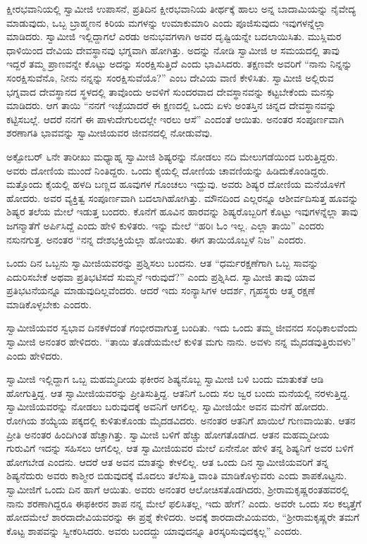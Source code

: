 \vskip 2pt

 ಕ್ಷೀರಭವಾನಿಯಲ್ಲಿ ಸ್ವಾಮೀಜಿ ಉಪಾಸನೆ, ಪ್ರತಿದಿನ ಕ್ಷೀರಭವಾನಿಯ ತೀರ್ಥಕ್ಕೆ ಹಾಲು ಅನ್ನ ಬಾದಾಮಿಯನ್ನು ನೈವೇದ್ಯ ಮಾಡುವುದು, ಒಬ್ಬ ಬ್ರಾಹ್ಮಣನ ಕಿರಿಯ ಮಗಳನ್ನು ಉಮಾಕುಮಾರಿ ಎಂದು ಪೂಜಿಸುವುದು ಇವುಗಳನ್ನೆಲ್ಲಾ ಮಾಡಿದರು. ಸ್ವಾಮೀಜಿ ಇಲ್ಲಿದ್ದಾಗಲೆ ಎರಡು ಅನುಭವಗಳಾಗಿ ಅವರ ದೃಷ್ಟಿಯನ್ನೇ ಬದಲಾಯಿಸಿತು. ಮುಸ್ಲಿಮರ ಧಾಳಿಯಿಂದ ದೇವಿಯ ದೇವಸ್ಥಾನವು ಭಗ್ನವಾಗಿ ಹೋಗಿತ್ತು. ಅದನ್ನು ನೋಡಿ ಸ್ವಾಮೀಜಿ ಆ ಸಮಯದಲ್ಲಿ ತಾವು ಇದ್ದರೆ ತಮ್ಮ ಪ್ರಾಣವನ್ನೇ ಕೊಟ್ಟು ಅದನ್ನು ಸಂರಕ್ಷಿಸುತ್ತಿದೆ ಎಂದು ಭಾವಿಸಿದರು. ತಕ್ಷಣವೇ ಅವರಿಗೆ “ನಾನು ನಿನ್ನನ್ನು ಸಂರಕ್ಷಿಸುವೆನೊ, ನೀನು ನನ್ನನ್ನು ಸಂರಕ್ಷಿಸುವೆಯೊ?” ಎಂಬ ದೇವಿಯ ವಾಣಿ ಕೇಳಿಸಿತು. ಸ್ವಾಮೀಜಿ ಅಲ್ಲಿರುವ ಭಗ್ನವಾದ ದೇವಸ್ಥಾನದ ಸ್ಥಳದಲ್ಲಿ ತಾವೊಂದು ಅವಳಿಗೆ ಸುಂದರವಾದ ದೇವಸ್ಥಾನವನ್ನು ಕಟ್ಟಬೇಕೆಂದು ಮನಸ್ಸು ಮಾಡಿದರು. ಆಗ ತಾಯಿ “ನನಗೆ ಇಚ್ಛೆಯಾದರೆ ಈ ಕ್ಷಣದಲ್ಲಿ ಒಂದು ಏಳು ಅಂತಸ್ತಿನ ಚಿನ್ನದ ದೇವಸ್ಥಾನವನ್ನು ಕಟ್ಟಿಸಬಲ್ಲೆ. ಆದರೆ ನನಗೆ ಈ ಪಾಳುದೇಗುಲದಲ್ಲೇ ಇರಲು ಆಸೆ” ಎಂದಂತೆ ಆಯಿತು. ಅನಂತರ ಸಂಪೂರ್ಣವಾಗಿ ಶರಣಾಗತಿ ಭಾವವನ್ನು ಸ್ವಾಮೀಜಿಯವರ ಜೀವನದಲ್ಲಿ ನೋಡುವೆವು. 

\vskip 2pt

 ಅಕ್ಟೋಬರ್ ೬ನೇ ತಾರೀಖು ಮಧ್ಯಾಹ್ನ ಸ್ವಾಮೀಜಿ ಶಿಷ್ಯರನ್ನು ನೋಡಲು ನದಿ ಮೇಲುಗಡೆಯಿಂದ ಬರುತ್ತಿದ್ದರು. ಅವರು ದೋಣಿಯ ಮುಂದೆ ನಿಂತಿದ್ದರು. ಒಂದು ಕೈಯಲ್ಲಿ ದೋಣಿಯ ಚಾವಣಿಯನ್ನು ಹಿಡಿದುಕೊಂಡಿದ್ದರು. ಮತ್ತೊಂದು ಕೈಯಲ್ಲಿ ಹಳದಿ ಬಣ್ಣದ ಹೂವುಗಳ ಗೊಂಚಲು ಇದ್ದುವು. ಅವರು ಶಿಷ್ಯರ ದೋಣಿಯ ಮನೆಯೊಳಗೆ ಹೋದರು. ಅವರ ವ್ಯಕ್ತಿತ್ವ ಸಂಪೂರ್ಣವಾಗಿ ಬದಲಾಗಿಹೋಗಿತ್ತು. ಮೌನದಿಂದ ಎಲ್ಲರನ್ನೂ ಆಶೀರ್ವದಿಸುತ್ತ ಹೂವನ್ನು ಶಿಷ್ಯರ ತಲೆಯ ಮೇಲೆ ಇಡುತ್ತ ಬಂದರು. ಕೊನೆಗೆ ಹೂವಿನ ಹಾರವನ್ನು ಶಿಷ್ಯರೊಬ್ಬರಿಗೆ ಕೊಟ್ಟು ಇವುಗಳನ್ನೆಲ್ಲಾ ತಾವು ಜಗನ್ಮಾತೆಗೆ ಅರ್ಪಿಸಿದ್ದೆ ಎಂದು ಹೇಳಿ ಕುಳಿತರು. ಇನ್ನು ಮೇಲೆ “ಹರಿಃ ಓಂ ಇಲ್ಲ. ಎಲ್ಲಾ ತಾಯಿ” ಎಂದರು ನಸುನಗುತ್ತ. ಅನಂತರ “ನನ್ನ ದೇಶಭಕ್ತಿಯೆಲ್ಲಾ ಹೋಯಿತು. ಈಗ ತಾಯಿಯೊಬ್ಬಳೆ ನಿಜ” ಎಂದರು. 

\vskip 2pt

 ಒಂದು ದಿನ ಒಬ್ಬನು ಸ್ವಾಮೀಜಿಯವರನ್ನು ಪ್ರಶ್ನಿಸಲು ಬಂದನು. ಆತ “ಧರ್ಮರಕ್ಷಣೆಗಾಗಿ ಒಬ್ಬ ಸಾವನ್ನು ಎದುರಿಸಬೇಕೆ ಅಥವಾ ಪ್ರತಿಭಟಿಸದೆ ಸುಮ್ಮನೆ ಇರುವುದೆ?” ಎಂದು ಪ್ರಶ್ನಿಸಿದ. ಸ್ವಾಮೀಜಿ ತಾವು ಯಾವ ಪ್ರತಿಭಟನೆಯನ್ನೂ ಮಾಡುವುದಿಲ್ಲವೆಂದರು. ಆದರೆ ಇದು ಸಂನ್ಯಾಸಿಗಳ ಆದರ್ಶ, ಗೃಹಸ್ಥರು ಆತ್ಮ ರಕ್ಷಣೆ ಮಾಡಿಕೊಳ್ಳಬೇಕು ಎಂದರು. 

\vskip 2pt

 ಸ್ವಾಮೀಜಿಯವರ ಸ್ವಭಾವ ದಿನಕಳೆದಂತೆ ಗಂಭೀರವಾಗುತ್ತ ಬಂದಿತು. ಇದು ಒಂದು ತಮ್ಮ ಜೀವನದ ಸಂಧಿಕಾಲವೆಂದು ಸ್ವಾಮೀಜಿ ಅನಂತರ ಹೇಳಿದರು. “ತಾಯಿ ತೊಡೆಯಮೇಲೆ ಕುಳಿತ ಮಗು ನಾನು. ಅವಳು ನನ್ನ ಮೈದಡವುತ್ತಿರುವಳು” ಎಂದು ಹೇಳಿದರು. 

 ಸ್ವಾಮೀಜಿ ಇಲ್ಲಿದ್ದಾಗ ಒಬ್ಬ ಮಹಮ್ಮದೀಯ ಫಕೀರನ ಶಿಷ್ಯನೊಬ್ಬ ಸ್ವಾಮೀಜಿ ಬಳಿ ಬಂದು ಮಾತುಕತೆ ಆಡಿ ಹೋಗುತ್ತಿದ್ದ. ಆತ ಸ್ವಾಮೀಜಿಯವರನ್ನು ಪ್ರೀತಿಸುತ್ತಿದ್ದ. ಆತನಿಗೆ ಒಂದು ಸಲ ಜ್ವರ ಬಂದು ಮನೆಯಲ್ಲಿ ನರಳುತ್ತಿದ್ದ. ಸ್ವಾಮೀಜಿಯವರನ್ನು ನೋಡಲು ಬರುವುದಕ್ಕೆ ಅವನಿಗೆ ಆಗಲಿಲ್ಲ. ಸ್ವಾಮೀಜಿಯೇ ಅವನ ಮನೆಗೆ ಹೋದರು. ರೋಗಿಯ ಶಯ್ಯೆಯ ಪಕ್ಕದಲ್ಲಿ ಕುಳಿತುಕೊಂಡು ಮೈದಡವಿದರು. ಅನಂತರ ಆತನಿಗೆ ಖಾಯಿಲೆ ಗುಣವಾಯಿತು. ಆತನ ಪ್ರೀತಿ ಅನಂತರ ಹಿಂದಿಗಿಂತ ಹೆಚ್ಚಾಗಿತ್ತು. ಸ್ವಾಮೀಜಿ ಬಳಿಗೆ ಹೆಚ್ಚು ಹೋಗತೊಡಗಿದ. ಆತನ ಮಹಮ್ಮದೀಯ ಗುರುವಿಗೆ ಇದನ್ನು ಸಹಿಸಲು ಆಗಲಿಲ್ಲ. ಆತ ಸ್ವಾಮೀಜಿಯವರ ಮೇಲೆ ಏನೇನೋ ಹೇಳಿ ತನ್ನ ಶಿಷ್ಯನಿಗೆ ಅವರ ಬಳಿಗೆ ಹೋಗಬೇಡ ಎಂದನು. ಆದರೆ ಆತ ಅವನ ಮಾತನ್ನು ಕೇಳಲಿಲ್ಲ. ಆತ ಒಂದು ದಿನ ಸ್ವಾಮೀಜಿಯವರಿಗೆ ತನ್ನ ಶಿಷ್ಯನೆದುರು ಅವರು ಕಾಶ್ಮೀರ ಬಿಡುವುದಕ್ಕೆ ಮೊದಲು ತಲೆಸುತ್ತಿ ವಾಂತಿ ಮಾಡಿಕೊಳ್ಳುವರು ಎಂದು ಶಾಪಕೊಟ್ಟನು. ಸ್ವಾಮೀಜಿಗೆ ಒಂದು ದಿನ ಹಾಗೆ ಆಯಿತು. ಅವರು ಅನಂತರ ಆಲೋಚಿಸತೊಡಗಿದರು, ಶ‍್ರೀರಾಮಕೃಷ್ಣರಂತಹವರಲ್ಲಿ ನಾನು ಶರಣಾಗಿದ್ದರೂ ಈ\break ಫಕೀರನ ಶಾಪ ನನ್ನ ಮೇಲೆ ಫಲಿಸಿತಲ್ಲ, ಇದು ಹೇಗೆ? ಎಂದು. ಅವರೇ ಒಂದು ಸಲ ಕಲ್ಕತ್ತೆಗೆ ಹೋದಮೇಲೆ ಶಾರದಾದೇವಿಯವರನ್ನು ಈ ಪ್ರಶ್ನೆ ಕೇಳಿದರು. ಅದಕ್ಕೆ ಶಾರದಾದೇವಿಯವರು, “ಶ‍್ರೀರಾಮಕೃಷ್ಣರೇ ತಮಗೆ ಕೊಟ್ಟ ಶಾಪವನ್ನು ಸ್ವೀಕರಿಸಿದರು. ಅವರು ಬಂದದ್ದು ಯಾವುದನ್ನೂ ತಿರಸ್ಕರಿಸುವುದಕ್ಕಲ್ಲ” ಎಂದರು. 

